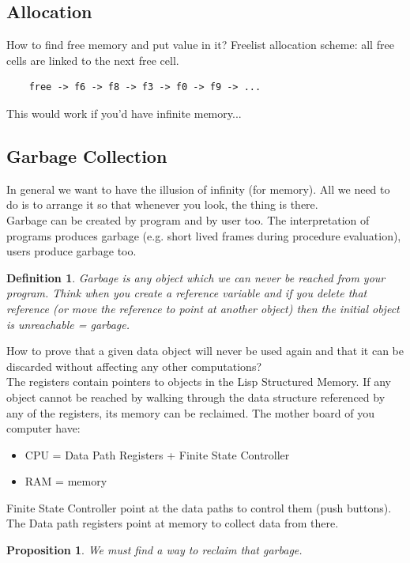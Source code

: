 \documentclass[a4paper,twoside]{article}
\newtheorem{proposition}[theorem]{Proposition}
\newtheorem{definition}[theorem]{Definition}
\numberwithin{equation}{section}
\begin{document}
\subsection{Allocation}
How to find free memory and put value in it?
Freelist allocation scheme: all free cells are linked to the next free cell.
\begin{lstlisting}
    free -> f6 -> f8 -> f3 -> f0 -> f9 -> ...
\end{lstlisting}
This would work if you'd have infinite memory...

\subsection{Garbage Collection}
In general we want to have the illusion of infinity (for memory). All we need to do is to
arrange it so that whenever you look, the thing is there.\\
Garbage can be created by program and by user too. The interpretation of programs produces garbage
(e.g. short lived frames during procedure evaluation), users produce garbage too.
\begin{definition}
    Garbage is any object which we can never be reached from your program. Think when you create a
    reference variable and if you delete that reference (or move the reference to point at another object)
    then the initial object is unreachable = garbage.
\end{definition}
How to prove that a given data object will never be used again and that it can be discarded without
affecting any other computations?\\
The registers contain pointers to objects in the Lisp Structured Memory. If any object cannot be
reached by walking through the data structure referenced by any of the registers, its memory can be
reclaimed. The mother board of you computer have:
\begin{itemize}
    \item CPU = Data Path Registers + Finite State Controller
    \item RAM = memory
\end{itemize}
Finite State Controller point at the data paths to control them (push buttons).
The Data path registers point at memory to collect data from there.

\begin{proposition}
    We must find a way to reclaim that garbage.
\end{proposition}
\end{document}
